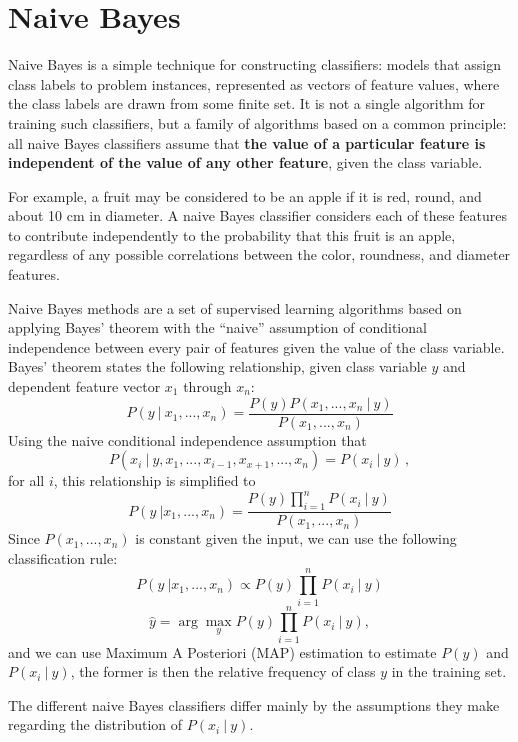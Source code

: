 \documentclass[a4paper, 11pt]{article}
\begin{document}
\section{Naive Bayes}

Naive Bayes is a simple technique for constructing classifiers: models that assign class labels to problem instances, represented as vectors of feature values, where the class labels are drawn from some finite set. It is not a single algorithm for training such classifiers, but a family of algorithms based on a common principle: all naive Bayes classifiers assume that \textbf{the value of a particular feature is independent of the value of any other feature}, given the class variable.

For example, a fruit may be considered to be an apple if it is red, round, and about 10 cm in diameter. A naive Bayes classifier considers each of these features to contribute independently to the probability that this fruit is an apple, regardless of any possible correlations between the color, roundness, and diameter features.

Naive Bayes methods are a set of supervised learning algorithms based on applying Bayes’ theorem with the ``naive'' assumption of conditional independence between every pair of features given the value of the class variable. Bayes’ theorem states the following relationship, given class variable $y$ and dependent feature vector $x_1$ through $x_n$:
$$P(y\ |\ x_1,...,x_n)=\frac{P(y)P(x_1,...,x_n\ |\ y)}{P(x_1,...,x_n)}$$
Using the naive conditional independence assumption that
$$P(x_i\ |\ y,x_1,...,x_{i-1},x_{x+1},...,x_n)=P(x_i\ |\ y)\,,$$
for all $i$, this relationship is simplified to
$$P(y\ | x_1,...,x_n)=\frac{P(y)\prod_{i=1}^n P(x_i\ |\ y)}{P(x_1,...,x_n)}$$
Since $P(x_1,...,x_n)$ is constant given the input, we can use the following classification rule:
$$P(y\ | x_1,...,x_n)\propto P(y)\prod_{i=1}^n P(x_i\ |\ y)$$
$$\hat{y}=\arg\max\limits_y P(y)\prod^n_{i=1}P(x_i\ |\ y),$$
and we can use Maximum A Posteriori (MAP) estimation to estimate $P(y)$ and $P(x_i\ |\ y)$, the former is then the relative frequency of class $y$ in the training set.

The different naive Bayes classifiers differ mainly by the assumptions they make regarding the distribution of $P(x_i\ |\ y)$.
\end{document}
